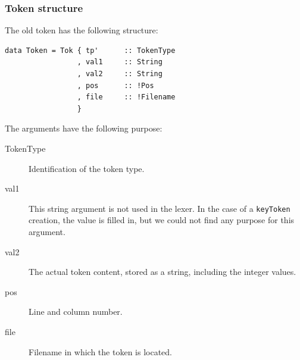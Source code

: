 \subsubsection{Token structure}
The old token has the following structure:

\begin{verbatim}
data Token = Tok { tp'      :: TokenType
                 , val1     :: String
                 , val2     :: String
                 , pos      :: !Pos
                 , file     :: !Filename
                 }
\end{verbatim}

The arguments have the following purpose:

\begin{description}
  \item[TokenType]
    Identification of the token type.
  \item[val1]
    This string argument is not used in the lexer.
    In the case of a \texttt{keyToken} creation, the value is filled in, but we could not find any purpose for this argument.
  \item[val2]
    The actual token content, stored as a string, including the integer values.
  \item[pos]
    Line and column number.
  \item[file]
     Filename in which the token is located.
\end{description}

